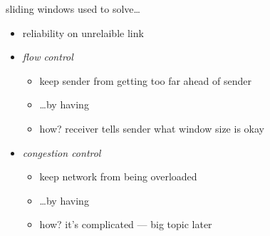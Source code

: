 \begin{frame}{sliding windows used to solve\ldots}
    \begin{itemize}
    \item reliability on unrelaible link
    \item \textit{flow control}
        \begin{itemize}
        \item keep sender from getting too far ahead of sender
        \item \ldots by having 
        \item how? receiver tells sender what window size is okay
        \end{itemize}
    \item \textit{congestion control}
        \begin{itemize}
        \item keep network from being overloaded
        \item \ldots by having 
        \item how? it's complicated --- big topic later
        \end{itemize}
    \end{itemize}
\end{frame}

